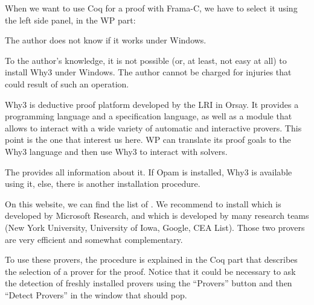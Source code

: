 When we want to use Coq for a proof with Frama-C, we have to select it
using the left side panel, in the WP part:





\begin{Information}
  The author does not know if it works under Windows.
\end{Information}




\begin{Warning}
  To the author's knowledge, it is not possible (or, at least, not easy
  at all) to install Why3 under Windows. The author cannot be charged for
  injuries that could result of such an operation.
\end{Warning}


Why3 is deductive proof platform developed by the LRI in Orsay. It
provides a programming language and a specification language, as well as
a module that allows to interact with a wide variety of automatic and
interactive provers. This point is the one that interest us here. WP can
translate its proof goals to the Why3 language and then use Why3 to
interact with solvers.



The  provides all information
about it. If Opam is installed, Why3 is available using it, else, there
is another installation procedure.



On this website, we can find the list of
.
We recommend to install
 which is
developed by Microsoft Research, and
 which is developed by many
research teams (New York University, University of Iowa, Google, CEA
List). Those two provers are very efficient and somewhat complementary.



To use these provers, the procedure is explained in the Coq part that
describes the selection of a prover for the proof. Notice that it could
be necessary to ask the detection of freshly installed provers using the
``Provers'' button and then ``Detect Provers'' in the window that should
pop.
